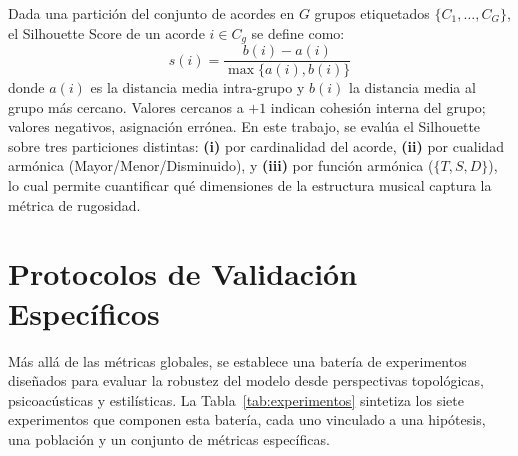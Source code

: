 \begin{definition}
Dada una partición del conjunto de acordes en $G$ grupos etiquetados $\{C_1, \dots, C_G\}$, el Silhouette Score de un acorde $i \in C_g$ se define como:
\begin{equation}
s(i) = \frac{b(i) - a(i)}{\max\{a(i), b(i)\}}
\end{equation}
donde $a(i)$ es la distancia media intra-grupo y $b(i)$ la distancia media al grupo más cercano. Valores cercanos a $+1$ indican cohesión interna del grupo; valores negativos, asignación errónea. En este trabajo, se evalúa el Silhouette sobre tres particiones distintas: \textbf{(i)} por cardinalidad del acorde, \textbf{(ii)} por cualidad armónica (Mayor/Menor/Disminuido), y \textbf{(iii)} por función armónica ($\{T, S, D\}$), lo cual permite cuantificar qué dimensiones de la estructura musical captura la métrica de rugosidad.
\end{definition}

\section{Protocolos de Validación Específicos}
\label{sec:protocolos_validacion}

Más allá de las métricas globales, se establece una batería de experimentos diseñados para evaluar la robustez del modelo desde perspectivas topológicas, psicoacústicas y estilísticas. La Tabla~\ref{tab:experimentos} sintetiza los siete experimentos que componen esta batería, cada uno vinculado a una hipótesis, una población y un conjunto de métricas específicas.

